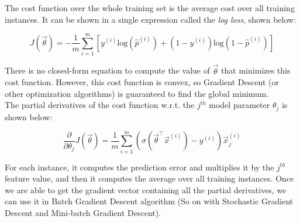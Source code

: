 \noindent 
The cost function over the whole training set is the average cost over all training 
instances. It can be shown in a single expression called the \textit{log loss}, shown below:

$$J(\vec{\theta}) = -\frac{1}{m} \sum_{i=1}^{m} [y^{(i)} \text{log}(\hat{p}^{(i)}) + (1-y^{(i)})\text{log}(1-\hat{p}^{(i)})]$$

\noindent 
There is no closed-form equation to compute the value of $\vec{\theta}$ that minimizes this
cost function. However, this cost function is convex, so Gradient Descent (or other optimization
algorithms) is guaranteed to find the global minimum.\\

\noindent 
The partial derivatives of the cost function w.r.t. the $j^{th}$ model parameter $\theta_{j}$
is shown below:

$$\frac{\partial}{\partial \theta_{j}} J(\vec{\theta}) = \frac{1}{m} \sum_{i=1}^{m} (\sigma(\vec{\theta}^{\intercal}\vec{x}^{(i)})-y^{(i)})\vec{x}_{j}^{(i)}$$

\noindent 
For each instance, it computes the prediction error and multiplies it by the $j^{th}$
feature value, and then it computes the average over all training instances. Once we are able to get
the gradient vector containing all the partial derivatives, we can use it in Batch Gradient Descent
algorithm (So on with Stochastic Gradient Descent and Mini-batch Gradient Descent).
